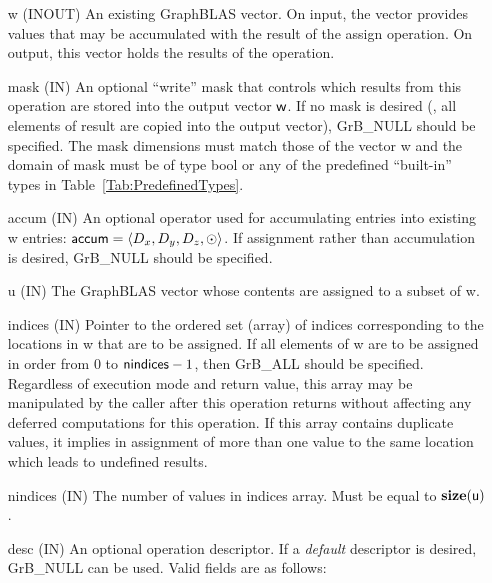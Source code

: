 \begin{itemize}[leftmargin=1in]
    \item[{\sf w}]    ({\sf INOUT}) An existing GraphBLAS vector.  On input,
    the vector provides values that may be accumulated with the result of the
    assign operation.  On output, this vector holds the results of the
    operation.

    \item[{\sf mask}]  ({\sf IN}) An optional ``write'' mask that controls which
    results from this operation are stored into the output vector
    ${\sf w}$.  If no mask is desired (\ie, all elements
    of result are copied into the output vector), {\sf GrB\_NULL}
    should be specified. The mask dimensions must match those of the
    vector {\sf w} and the domain of {\sf mask} must be
    of type {\sf bool} or any of the predefined ``built-in'' types in
    Table~\ref{Tab:PredefinedTypes}.

    \item[{\sf accum}]    ({\sf IN}) An optional operator used for accumulating
    entries into existing {\sf w} entries: ${\sf accum} = \langle D_x,
    D_y, D_z,\odot \rangle$. If assignment rather than accumulation is
    desired, {\sf GrB\_NULL} should be specified.

    \item[{\sf u}]        ({\sf IN}) The GraphBLAS vector whose contents are 
    assigned to a subset of {\sf w}.
    
    \item[{\sf indices}]  ({\sf IN}) Pointer to the ordered set (array) of 
    indices corresponding to the locations in {\sf w} that are to be assigned.  
    If all elements of {\sf w} are to be assigned in order from $0$ to 
    ${\sf nindices} - 1$, then {\sf GrB\_ALL} should be specified.  Regardless of 
    execution mode and return value, this array may be manipulated by the caller
    after this operation returns without affecting any deferred computations for 
    this operation.  
    If this array contains duplicate values, it implies in assignment of more 
    than one value to the same location which leads to undefined results.
    
    \item[{\sf nindices}] ({\sf IN}) The number of values in {\sf indices} array.
    Must be equal to $\bold{size}({\sf u})$.

    \item[{\sf desc}]     ({\sf IN}) An optional operation descriptor.  If a 
    \emph{default} descriptor is desired, {\sf GrB\_NULL} can be used.  Valid 
    fields are as follows: \\
    

\end{itemize}
